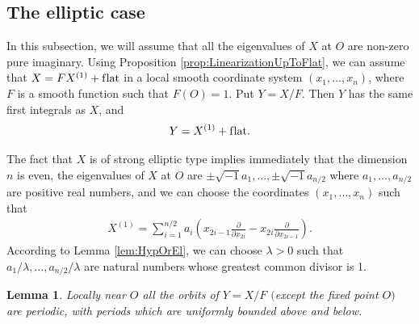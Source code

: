 \documentclass[11pt]{article}
\numberwithin{equation}{section}
\newtheorem{lem}[thm]{Lemma}
\begin{document}
\subsection{The elliptic case} In this subsection, we will assume that all the eigenvalues of $X$ at $O$
are non-zero pure imaginary. Using Proposition \ref{prop:LinearizationUpToFlat}, we can assume that
$X = FX^{(1)} + \text{f\/lat}$ in a local smooth coordinate system $(x_1,\dots,x_n)$, where $F$ is a smooth
function such that $F(O) =1$. Put $Y = X/F$. Then $Y$ has the same f\/irst integrals as $X$, and
\begin{gather*} %
 Y = X^{(1)} + \text{f\/lat}.
\end{gather*}

The fact that $X$ is of strong elliptic type implies immediately that the dimension $n$ is even, the eigenvalues of $X$
at $O$ are $\pm \sqrt{-1} a_1,\dots, \pm \sqrt{-1} a_{n/2}$ where $a_1, \dots, a_{n/2}$ are positive real numbers,
and we can choose the coordinates $(x_1,\dots,x_n)$ such that
\begin{gather} \label{eqn:LinearElliptic}
 X^{(1)} = \sum_{i=1}^{n/2} a_i \left(x_{2i-1} \frac{\partial}{\partial x_{2i}} - x_{2i} \frac{\partial}{\partial x_{2i-1}}\right).
\end{gather}
According to Lemma \ref{lem:HypOrEl}, we can choose $\lambda > 0$ such that $a_1/\lambda, \dots, a_{n/2}/ \lambda$
are natural numbers whose greatest common divisor is 1.

\begin{lem} \label{lem:AllPeriodic}
Locally near $O$ all the orbits of $Y = X/F$ $($except the fixed point $O)$ are periodic, with periods which
are uniformly bounded above and below.
\end{lem}
\end{document}
